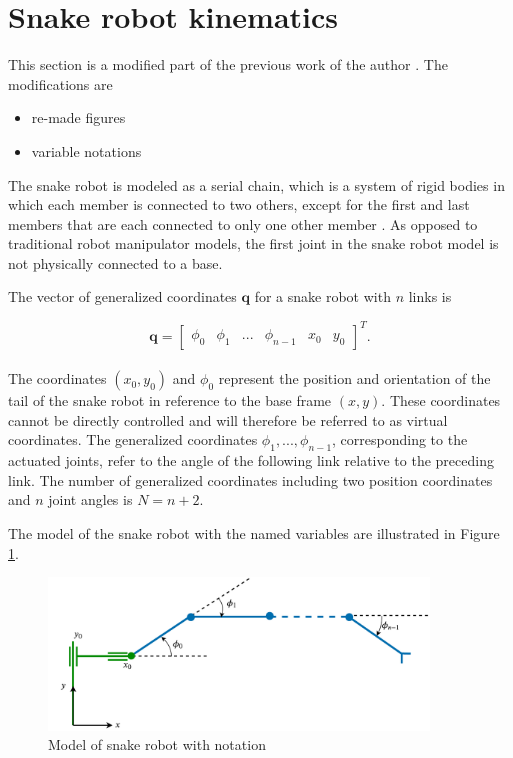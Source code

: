 \section{Snake robot kinematics}\label{sec:kin}

This section is a modified part of the previous work of the author \cite{AtussaProsjektoppgp}. The modifications are 
\begin{itemize}
    \item re-made figures
    \item variable notations
\end{itemize}

The snake robot is modeled as a serial chain, which is a system of rigid bodies in which each member is connected to two others, except for the first and last members that are each connected to only one other member \cite{waldron2016kinematics}. As opposed to traditional robot manipulator models, the first joint in the snake robot model is not physically connected to a base.


The vector of generalized coordinates $\mathbf{q}$ for a snake robot with $n$ links is

\begin{equation} \label{eq:q}
    \mathbf{q} = 
    \begin{bmatrix}
        \phi_0 & \phi_1 & ... & \phi_{n-1} & x_0 & y_0
    \end{bmatrix}^T.
\end{equation}
\\
The coordinates $(x_0, y_0)$ and $\phi_0$ represent the position and orientation of the tail of the snake robot in reference to the base frame $(x,y)$. These coordinates cannot be directly controlled and will therefore be referred to as virtual coordinates. The generalized coordinates ${\phi_1, ... ,  \phi_{n-1}}$, corresponding to the actuated joints, refer to the angle of the following link relative to the preceding link. The number of generalized coordinates including two position coordinates and $n$ joint angles is $N = n+2$.

The model of the snake robot with the named variables are illustrated in Figure \ref{fig:kin_name}. 
\begin{figure}
    \centering
    \includegraphics[width=0.9\textwidth]{figures/theory/kinematics1.pdf}
    \caption{Model of snake robot with notation}
    \label{fig:kin_name}
\end{figure}


